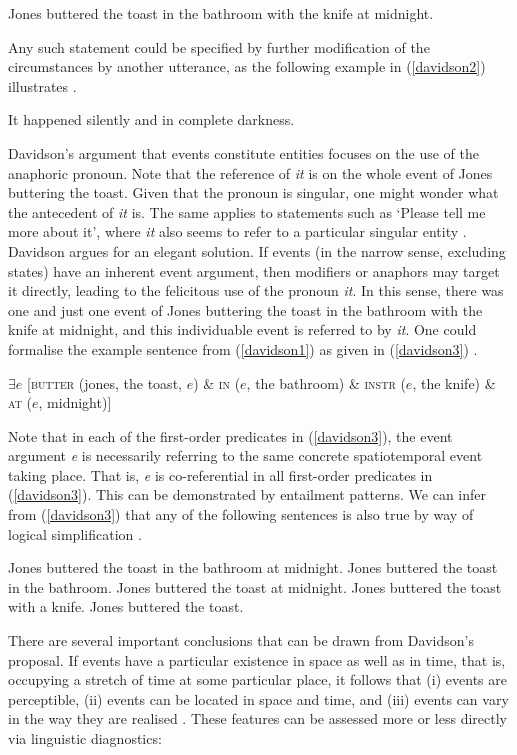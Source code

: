\ea \label{davidson1}
Jones buttered the toast in the bathroom with the knife at midnight.
\z

Any such statement could be specified by further modification of the circumstances by another utterance, as the following example in (\ref{davidson2}) illustrates \citep[804]{maienborn2011event}. 

\ea \label{davidson2}
It happened silently and in complete darkness.
\z

Davidson's argument that events constitute entities focuses on the use of the anaphoric pronoun. Note that the reference of \textit{it} is on the whole event of Jones buttering the toast. Given that the pronoun is singular, one might wonder what the antecedent of \textit{it} is. The same applies to statements such as `Please tell me more about it', where \textit{it} also seems to refer to a particular singular entity \citep[108]{davidson1967logical}. Davidson argues for an elegant solution. If events (in the narrow sense, excluding states) have an inherent event argument, then modifiers or anaphors may target it directly, leading to the felicitous use of the pronoun \textit{it}. In this sense, there was one and just one event of Jones buttering the toast in the bathroom with the knife at midnight, and this individuable event is referred to by \textit{it}. One could formalise the example sentence from (\ref{davidson1}) as given in (\ref{davidson3}) \citep[805]{maienborn2011event}.

\ea \label{davidson3}
$\exists e$ [\textsc{butter} (jones, the toast, $e$) \& \textsc{in} ($e$, the bathroom) \& \textsc{instr} ($e$, the knife) \& \textsc{at} ($e$, midnight)]
\z

Note that in each of the first-order predicates in (\ref{davidson3}), the event argument \emph{e} is necessarily referring to the same concrete spatiotemporal event taking place. That is, \emph{e} is co-referential in all first-order predicates in (\ref{davidson3}). This can be demonstrated by entailment patterns. We can infer from (\ref{davidson3}) that any of the following sentences is also true by way of logical simplification \citep[805]{maienborn2011event}.

\ea
\ea Jones buttered the toast in the bathroom at midnight.
\ex Jones buttered the toast in the bathroom.
\ex Jones buttered the toast at midnight.
\ex Jones buttered the toast with a knife.
\ex Jones buttered the toast.
\z
\z

There are several important conclusions that can be drawn from Davidson's proposal. If events have a particular existence in space as well as in time, that is, occupying a stretch of time at some particular place, it follows that (i) events are perceptible, (ii) events can be located in space and time, and (iii) events can vary in the way they are realised \citep[280]{maienborn2005limits}. These features can be assessed more or less directly via linguistic diagnostics:

